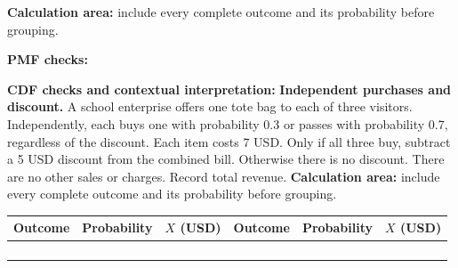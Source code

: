 \textbf{Calculation area:} include every complete outcome and its probability before grouping.
\par\noindent\begin{minipage}[t]{.37\linewidth}\vspace{0pt}\centering
{}\end{minipage}\hfill\begin{minipage}[t]{.60\linewidth}\vspace{0pt}\centering
{}
\end{minipage}\par
\textbf{PMF checks:} \hrulefill\par
{}
\par\noindent\begin{minipage}[t]{.37\linewidth}\vspace{0pt}\centering
{}\end{minipage}\hfill\begin{minipage}[t]{.60\linewidth}\vspace{0pt}\centering
{}
\end{minipage}\par
\textbf{CDF checks and contextual interpretation:}
\vfill
\clearpage
{}
\textbf{Independent purchases and discount.} A school enterprise offers one tote bag to each of three visitors. Independently, each buys one with probability 0.3 or passes with probability 0.7, regardless of the discount. Each item costs 7 USD. Only if all three buy, subtract a 5 USD discount from the combined bill. Otherwise there is no discount. There are no other sales or charges. Record total revenue.
\textbf{Calculation area:} include every complete outcome and its probability before grouping.
\par\noindent\begin{tabularx}{\linewidth}{|Y|Y|Y|Y|Y|Y|}\hline Outcome & Probability & $X$ (USD) & Outcome & Probability & $X$ (USD)\\\hline
\rule{0pt}{.63cm}& & & & & \\\hline
\rule{0pt}{.63cm}& & & & & \\\hline
\rule{0pt}{.63cm}& & & & & \\\hline
\rule{0pt}{.63cm}& & & & & \\\hline
\end{tabularx}
